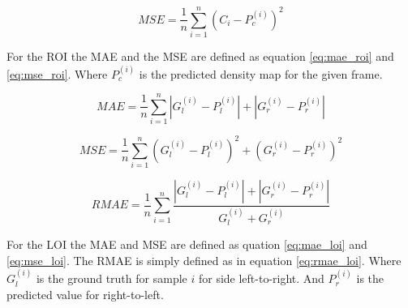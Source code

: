 \begin{equation}
\label{eq:mse_roi}
	MSE = \frac{1}{n}\sum^n_{i=1}(C_i-P_c^{(i)})^2
\end{equation}

For the ROI the MAE and the MSE are defined as equation \ref{eq:mae_roi} and \ref{eq:mse_roi}. Where $P_c^{(i)}$ is the predicted density map for the given frame.

\begin{equation}
\label{eq:mae_loi}
	MAE = \frac{1}{n}\sum^n_{i=1}|G_l^{(i)}-P_l^{(i)}|+|G_r^{(i)}-P_r^{(i)}|
\end{equation}

\begin{equation}
\label{eq:mse_loi}
	MSE = \frac{1}{n}\sum^n_{i=1}(G_l^{(i)}-P_l^{(i)})^2+(G_r^{(i)}-P_r^{(i)})^2
\end{equation}

\begin{equation}
\label{eq:rmae_loi}
	RMAE = \frac{1}{n}\sum^n_{i=1}\frac{|G_l^{(i)}-P_l^{(i)}|+|G_r^{(i)}-P_r^{(i)}|}{G_l^{(i)} + G_r^{(i)}}
\end{equation}

For the LOI the MAE and MSE are defined as quation \ref{eq:mae_loi} and \ref{eq:mse_loi}. The RMAE is simply defined as in equation \ref{eq:rmae_loi}. Where $G_l^{(i)}$ is the ground truth for sample $i$ for side left-to-right. And $P_r^{(i)}$ is the predicted value for right-to-left.
